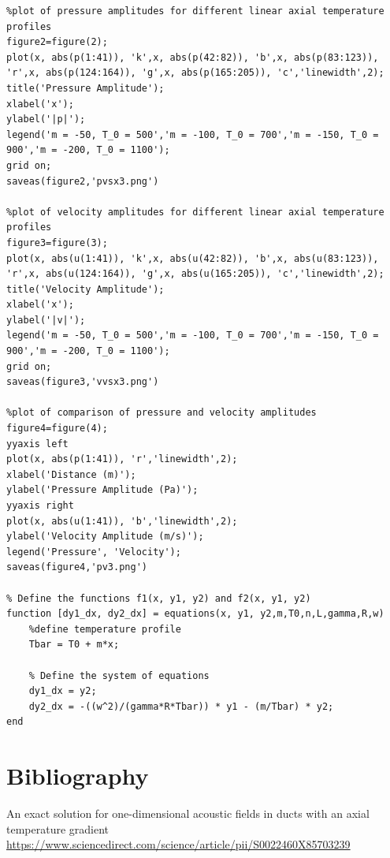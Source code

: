 \documentclass[8pt]{article} %
\begin{document}
\begin{lstlisting}
%plot of pressure amplitudes for different linear axial temperature profiles
figure2=figure(2);
plot(x, abs(p(1:41)), 'k',x, abs(p(42:82)), 'b',x, abs(p(83:123)), 'r',x, abs(p(124:164)), 'g',x, abs(p(165:205)), 'c','linewidth',2);
title('Pressure Amplitude');
xlabel('x');
ylabel('|p|');
legend('m = -50, T_0 = 500','m = -100, T_0 = 700','m = -150, T_0 = 900','m = -200, T_0 = 1100');
grid on;
saveas(figure2,'pvsx3.png')

%plot of velocity amplitudes for different linear axial temperature profiles
figure3=figure(3);
plot(x, abs(u(1:41)), 'k',x, abs(u(42:82)), 'b',x, abs(u(83:123)), 'r',x, abs(u(124:164)), 'g',x, abs(u(165:205)), 'c','linewidth',2);
title('Velocity Amplitude');
xlabel('x');
ylabel('|v|');
legend('m = -50, T_0 = 500','m = -100, T_0 = 700','m = -150, T_0 = 900','m = -200, T_0 = 1100');
grid on;
saveas(figure3,'vvsx3.png')

%plot of comparison of pressure and velocity amplitudes
figure4=figure(4);
yyaxis left
plot(x, abs(p(1:41)), 'r','linewidth',2);
xlabel('Distance (m)');
ylabel('Pressure Amplitude (Pa)');
yyaxis right
plot(x, abs(u(1:41)), 'b','linewidth',2);
ylabel('Velocity Amplitude (m/s)');
legend('Pressure', 'Velocity');
saveas(figure4,'pv3.png') 

% Define the functions f1(x, y1, y2) and f2(x, y1, y2)
function [dy1_dx, dy2_dx] = equations(x, y1, y2,m,T0,n,L,gamma,R,w)
    %define temperature profile
    Tbar = T0 + m*x;
    
    % Define the system of equations
    dy1_dx = y2;
    dy2_dx = -((w^2)/(gamma*R*Tbar)) * y1 - (m/Tbar) * y2;
end
\end{lstlisting}

\section{Bibliography}
\begin{thebibliography}{99}

An exact solution for one-dimensional acoustic fields in ducts with an axial temperature gradient\\ \url{https://www.sciencedirect.com/science/article/pii/S0022460X85703239}
\end{thebibliography}
\end{document}
